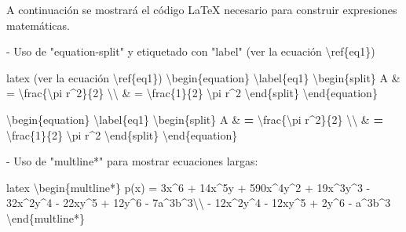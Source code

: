 \documentclass[11pt,a4paper,oneside,]{article}
\newenvironment{Shaded}{\begin{snugshade}}{\end{snugshade}}
\newcommand{\AttributeTok}[1]{\textcolor[rgb]{0.77,0.63,0.00}{#1}}
\newcommand{\DecValTok}[1]{\textcolor[rgb]{0.00,0.00,0.81}{#1}}
\newcommand{\ErrorTok}[1]{\textcolor[rgb]{0.64,0.00,0.00}{\textbf{#1}}}
\newcommand{\NormalTok}[1]{#1}
\newcommand{\SpecialCharTok}[1]{\textcolor[rgb]{0.00,0.00,0.00}{#1}}
\newcommand{\StringTok}[1]{\textcolor[rgb]{0.31,0.60,0.02}{#1}}
\numberwithin{dummy}{section}
\theoremstyle{ocrenumbox}
\theoremstyle{blacknumex}
\theoremstyle{blacknumbox}
\theoremstyle{ocrenum}
\theoremstyle{ocrenum}
\begin{document}
\begin{Shaded}
\begin{Highlighting}[numbers=left,,firstnumber=1101,]
\NormalTok{A continuación se mostrará el código LaTeX necesario para construir expresiones matemáticas.}


\SpecialCharTok{{-}}\NormalTok{ Uso de }\StringTok{"equation{-}split"}\NormalTok{ y etiquetado con }\StringTok{"label"}\NormalTok{ (ver la ecuación \textbackslash{}ref\{eq1\})}

\StringTok{\textasciigrave{}\textasciigrave{}\textasciigrave{}}\AttributeTok{latex}
\AttributeTok{(ver la ecuación }\SpecialCharTok{\textbackslash{}r}\AttributeTok{ef\{eq1\})}
\SpecialCharTok{\textbackslash{}b}\AttributeTok{egin\{equation\} \textbackslash{}label\{eq1\}}
\SpecialCharTok{\textbackslash{}b}\AttributeTok{egin\{split\}}
\AttributeTok{A \& = }\SpecialCharTok{\textbackslash{}f}\AttributeTok{rac\{\textbackslash{}pi r\^{}2\}\{2\} }\SpecialCharTok{\textbackslash{}\textbackslash{}}
\AttributeTok{ \& = }\SpecialCharTok{\textbackslash{}f}\AttributeTok{rac\{1\}\{2\} \textbackslash{}pi r\^{}2}
\SpecialCharTok{\textbackslash{}e}\AttributeTok{nd\{split\}}
\SpecialCharTok{\textbackslash{}e}\AttributeTok{nd\{equation\}}
\StringTok{\textasciigrave{}\textasciigrave{}\textasciigrave{}}

\NormalTok{\textbackslash{}begin\{equation\} \textbackslash{}label\{eq1\}}
\NormalTok{\textbackslash{}begin\{split\}}
\NormalTok{A }\SpecialCharTok{\&} \ErrorTok{=}\NormalTok{ \textbackslash{}frac\{\textbackslash{}pi r}\SpecialCharTok{\^{}}\DecValTok{2}\NormalTok{\}\{}\DecValTok{2}\NormalTok{\} \textbackslash{}\textbackslash{}}
 \SpecialCharTok{\&} \ErrorTok{=}\NormalTok{ \textbackslash{}frac\{}\DecValTok{1}\NormalTok{\}\{}\DecValTok{2}\NormalTok{\} \textbackslash{}pi r}\SpecialCharTok{\^{}}\DecValTok{2}
\NormalTok{\textbackslash{}end\{split\}}
\NormalTok{\textbackslash{}end\{equation\}}


\SpecialCharTok{{-}}\NormalTok{ Uso de }\StringTok{"\textasciigrave{}multline*\textasciigrave{}"}\NormalTok{ para mostrar ecuaciones largas}\SpecialCharTok{:}

\StringTok{\textasciigrave{}\textasciigrave{}\textasciigrave{}}\AttributeTok{latex}
\SpecialCharTok{\textbackslash{}b}\AttributeTok{egin\{multline*\}}
\AttributeTok{p(x) = 3x\^{}6 + 14x\^{}5y + 590x\^{}4y\^{}2 + 19x\^{}3y\^{}3 }
\AttributeTok{            {-} 32x\^{}2y\^{}4 {-} 22xy\^{}5 + 12y\^{}6 {-} 7a\^{}3b\^{}3}\SpecialCharTok{\textbackslash{}\textbackslash{}}\AttributeTok{ }
\AttributeTok{{-} 12x\^{}2y\^{}4 {-} 12xy\^{}5 + 2y\^{}6 {-} a\^{}3b\^{}3}
\SpecialCharTok{\textbackslash{}e}\AttributeTok{nd\{multline*\}}
\StringTok{\textasciigrave{}\textasciigrave{}\textasciigrave{}}


\end{Highlighting}
\end{Shaded}
\end{document}
